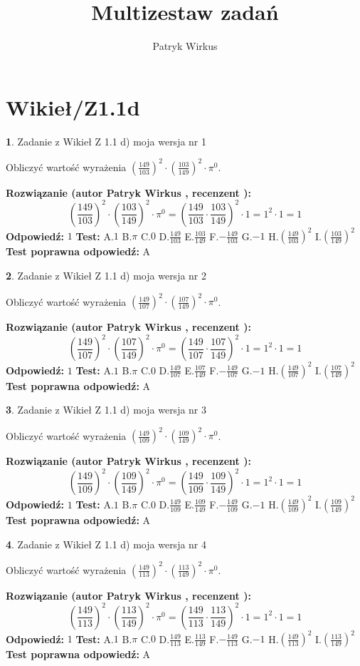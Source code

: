 \documentclass[12pt, a4paper]{article}
\title{Multizestaw zadań}
\author{Patryk Wirkus}
\date{}
\theoremstyle{definition} %
\newtheorem{zad}{}
\newcommand{\kategoria}[1]{\section{#1}}
\newcommand{\zadStart}[1]{\begin{zad}#1\newline}
\newcommand{\zadStop}{\end{zad}}
\newcommand{\rozwStart}[2]{\noindent \textbf{Rozwiązanie (autor #1 , recenzent #2): }\newline}
\newcommand{\rozwStop}{\newline}
\newcommand{\odpStart}{\noindent \textbf{Odpowiedź:}\newline}
\newcommand{\odpStop}{\newline}
\newcommand{\testStart}{\noindent \textbf{Test:}\newline}
\newcommand{\testStop}{\newline}
\newcommand{\kluczStart}{\noindent \textbf{Test poprawna odpowiedź:}\newline}
\newcommand{\kluczStop}{\newline}
\begin{document}
\maketitle

\kategoria{Wikieł/Z1.1d}


\zadStart{Zadanie z Wikieł Z 1.1 d) moja wersja nr 1}

Obliczyć wartość wyrażenia $(\frac{149}{103})^{2} \cdot (\frac{103}{149})^{2} \cdot \pi^{0}$.
\zadStop
\rozwStart{Patryk Wirkus}{}
$$(\frac{149}{103})^{2} \cdot (\frac{103}{149})^{2} \cdot \pi^{0} = (\frac{149}{103} \cdot \frac{103}{149})^{2} \cdot 1 = 1^{2} \cdot 1 = 1$$
\rozwStop
\odpStart
$1$
\odpStop
\testStart
A.$1$ B.$\pi$ C.$0$ D.$\frac{149}{103}$ E.$\frac{103}{149}$
F.$-\frac{149}{103}$ G.$-1$
H.$(\frac{149}{103})^{2}$
I.$(\frac{103}{149})^{2}$
\testStop
\kluczStart
A
\kluczStop



\zadStart{Zadanie z Wikieł Z 1.1 d) moja wersja nr 2}

Obliczyć wartość wyrażenia $(\frac{149}{107})^{2} \cdot (\frac{107}{149})^{2} \cdot \pi^{0}$.
\zadStop
\rozwStart{Patryk Wirkus}{}
$$(\frac{149}{107})^{2} \cdot (\frac{107}{149})^{2} \cdot \pi^{0} = (\frac{149}{107} \cdot \frac{107}{149})^{2} \cdot 1 = 1^{2} \cdot 1 = 1$$
\rozwStop
\odpStart
$1$
\odpStop
\testStart
A.$1$ B.$\pi$ C.$0$ D.$\frac{149}{107}$ E.$\frac{107}{149}$
F.$-\frac{149}{107}$ G.$-1$
H.$(\frac{149}{107})^{2}$
I.$(\frac{107}{149})^{2}$
\testStop
\kluczStart
A
\kluczStop



\zadStart{Zadanie z Wikieł Z 1.1 d) moja wersja nr 3}

Obliczyć wartość wyrażenia $(\frac{149}{109})^{2} \cdot (\frac{109}{149})^{2} \cdot \pi^{0}$.
\zadStop
\rozwStart{Patryk Wirkus}{}
$$(\frac{149}{109})^{2} \cdot (\frac{109}{149})^{2} \cdot \pi^{0} = (\frac{149}{109} \cdot \frac{109}{149})^{2} \cdot 1 = 1^{2} \cdot 1 = 1$$
\rozwStop
\odpStart
$1$
\odpStop
\testStart
A.$1$ B.$\pi$ C.$0$ D.$\frac{149}{109}$ E.$\frac{109}{149}$
F.$-\frac{149}{109}$ G.$-1$
H.$(\frac{149}{109})^{2}$
I.$(\frac{109}{149})^{2}$
\testStop
\kluczStart
A
\kluczStop



\zadStart{Zadanie z Wikieł Z 1.1 d) moja wersja nr 4}

Obliczyć wartość wyrażenia $(\frac{149}{113})^{2} \cdot (\frac{113}{149})^{2} \cdot \pi^{0}$.
\zadStop
\rozwStart{Patryk Wirkus}{}
$$(\frac{149}{113})^{2} \cdot (\frac{113}{149})^{2} \cdot \pi^{0} = (\frac{149}{113} \cdot \frac{113}{149})^{2} \cdot 1 = 1^{2} \cdot 1 = 1$$
\rozwStop
\odpStart
$1$
\odpStop
\testStart
A.$1$ B.$\pi$ C.$0$ D.$\frac{149}{113}$ E.$\frac{113}{149}$
F.$-\frac{149}{113}$ G.$-1$
H.$(\frac{149}{113})^{2}$
I.$(\frac{113}{149})^{2}$
\testStop
\kluczStart
A
\kluczStop
\end{document}
